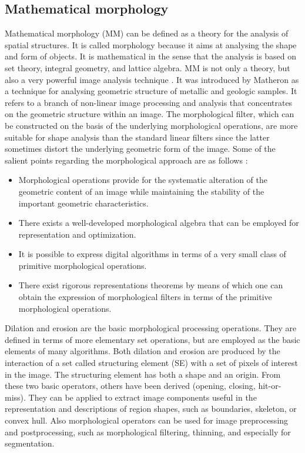 \documentclass[sensors,review,submit,moreauthors,pdftex,10pt,a4paper]{mdpi}
\begin{document}
\subsection{Mathematical morphology}
Mathematical morphology (MM) can be defined as a theory for the analysis of spatial structures. It is called morphology because it aims at analysing the shape and form of objects. It is mathematical in the sense that the analysis is based on set theory, integral geometry, and lattice algebra. MM is not only a theory, but also a very powerful image analysis technique \cite{Soille2004}.
It was introduced by Matheron as a technique for analysing geometric structure of metallic and geologic samples. It refers to a branch of non-linear image processing and analysis that concentrates on the geometric structure within an image.
The morphological filter, which can be constructed on the basis of the underlying morphological operations, are more suitable for shape analysis than the standard linear filters since the latter sometimes distort the underlying geometric form of the image. Some of the salient points regarding the morphological approach are as follows \cite{Giardina1988}:
\begin{itemize}[leftmargin=*,labelsep=5.8mm]
	\item Morphological operations provide for the systematic alteration of the geometric content of an image while maintaining the stability of the important geometric characteristics.
	\item There exists a well-developed morphological algebra that can be employed for representation and optimization.
	\item It is possible to express digital algorithms in terms of a very small class of primitive morphological operations.
	\item There exist rigorous representations theorems by means of which one can obtain the expression of morphological filters in terms of the primitive morphological operations.
\end{itemize}
Dilation and erosion are the basic morphological processing operations. They are defined in terms of more elementary set operations, but are employed as the basic elements of many algorithms. Both dilation and erosion are produced by the interaction of a set called structuring element (SE) with a set of pixels of interest in the image. The structuring element has both a shape and an origin. From these two basic operators, others have been derived (opening, closing, hit-or-miss). They can be applied to extract image components useful in the representation and descriptions of region shapes, such as boundaries, skeleton, or convex hull. Also morphological operators can be used for image preprocessing and postprocessing, such as morphological filtering, thinning, and especially for segmentation.
\end{document}

